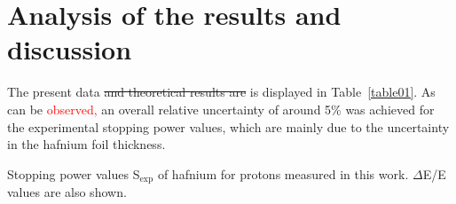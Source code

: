 \documentclass[aps,pra,reprint,superscriptaddress]{revtex4-1}
\def\clau#1{\textcolor{red}{#1}}
\begin{document}
\section{Analysis of the results and discussion}
\label{discussion}

The present data \st{and theoretical results are} is displayed in 
Table~\ref{table01}. %
As can be \clau{observed,} %
an overall relative uncertainty of around 5\% was 
achieved for the experimental stopping power values, which are mainly 
due to the uncertainty in the hafnium foil thickness. 

\begin{table}[!t]
\centering
\caption{Stopping power values S$_{\mathrm{exp}}$ of hafnium for protons measured 
in this work. $\Delta$E/E values are also shown.}
\label{table01}

\vspace{0.2cm}


\end{table}
\end{document}
